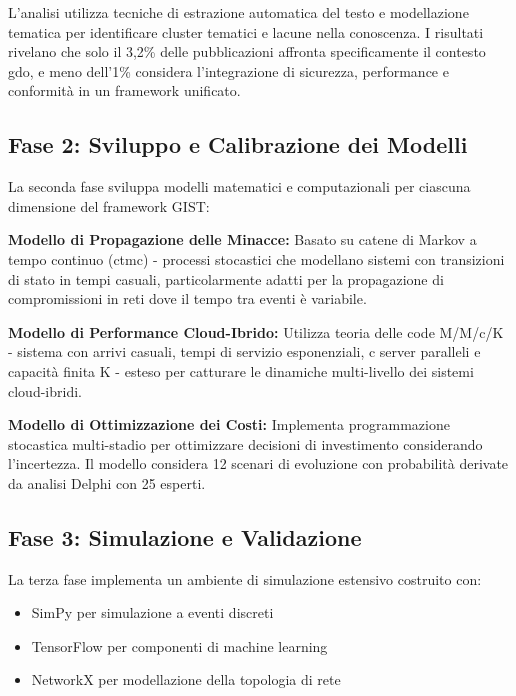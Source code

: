 L'analisi utilizza tecniche di estrazione automatica del testo e modellazione tematica per identificare cluster tematici e lacune nella conoscenza. I risultati rivelano che solo il 3,2\% delle pubblicazioni affronta specificamente il contesto \gls{gdo}, e meno dell'1\% considera l'integrazione di sicurezza, performance e conformità in un framework unificato.

\subsection{\texorpdfstring{Fase 2: Sviluppo e Calibrazione dei Modelli}{1.5.3 - Fase 2: Sviluppo e Calibrazione dei Modelli}}
\label{subsec:fase2}

La seconda fase sviluppa modelli matematici e computazionali per ciascuna dimensione del framework GIST:

\textbf{Modello di Propagazione delle Minacce:} Basato su catene di Markov a tempo continuo (\gls{ctmc}) - processi stocastici che modellano sistemi con transizioni di stato in tempi casuali, particolarmente adatti per la propagazione di compromissioni in reti dove il tempo tra eventi è variabile.

\textbf{Modello di Performance Cloud-Ibrido:} Utilizza teoria delle code M/M/c/K - sistema con arrivi casuali, tempi di servizio esponenziali, c server paralleli e capacità finita K - esteso per catturare le dinamiche multi-livello dei sistemi cloud-ibridi.

\textbf{Modello di Ottimizzazione dei Costi:} Implementa programmazione stocastica multi-stadio per ottimizzare decisioni di investimento considerando l'incertezza. Il modello considera 12 scenari di evoluzione con probabilità derivate da analisi Delphi con 25 esperti.

\subsection{\texorpdfstring{Fase 3: Simulazione e Validazione}{1.5.4 - Fase 3: Simulazione e Validazione}}
\label{subsec:fase3}

La terza fase implementa un ambiente di simulazione estensivo costruito con:
\begin{itemize}
\item SimPy per simulazione a eventi discreti
\item TensorFlow per componenti di machine learning
\item NetworkX per modellazione della topologia di rete
\end{itemize}

